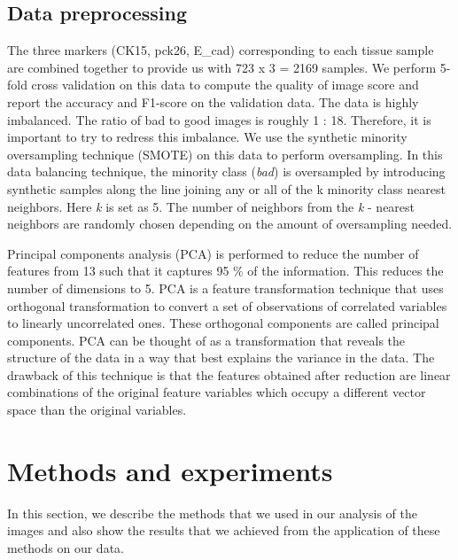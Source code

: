 \subsection{Data preprocessing}
The three markers (CK15, pck26, E\_cad) corresponding to each tissue sample are combined together to provide us with 723 x 3 = 2169 samples. We perform 5-fold cross validation on this data to compute the quality of image score and report the accuracy and F1-score on the validation data.
The data is highly imbalanced. The ratio of bad to good images is roughly 1 : 18. Therefore, it is important to try to redress this imbalance. We use the synthetic minority oversampling technique (SMOTE) \cite{chawla2002smote} on this data to perform oversampling.  In this data balancing technique, the minority class (\textit{bad}) is oversampled by introducing synthetic samples along the line joining any or all of the k minority class nearest neighbors. Here \textit{k} is set as 5. The number of neighbors from the \textit{k} - nearest neighbors are randomly chosen depending on the amount of oversampling needed.

Principal components analysis (PCA) \cite{wold1987principal} is performed to reduce the number of features from 13 such that it captures 95 \% of the information. This reduces the number of dimensions to 5.
PCA is a feature transformation technique that uses orthogonal transformation to convert a set of observations of correlated variables to linearly uncorrelated ones. These orthogonal components are called principal components. PCA can be thought of as a transformation that reveals the structure of the data in a way that best explains the variance in the data. The drawback of this technique is that the features obtained after reduction are linear combinations of the original feature variables which occupy a different vector space than the original variables. 


\section{Methods and experiments}
In this section, we describe the methods that we used in our analysis of the images and also show the results that we achieved from the application of these methods on our data.

